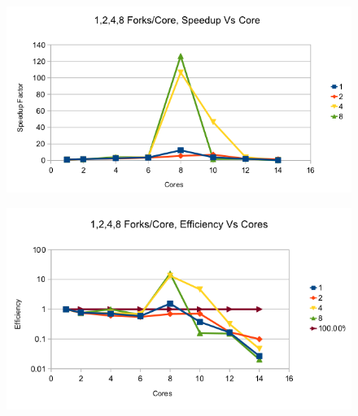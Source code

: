 \documentclass{bioinfo}
\begin{document}
\begin{figure}[h]
\includegraphics[width=\linewidth]{speedup-and-forks-on-cores.png}
\caption{}
\end{figure}
\begin{figure}[h]
\includegraphics[width=\linewidth]{log-efficiency-and-forks-on-cores.png}
\caption{}
\end{figure}
\end{document}
